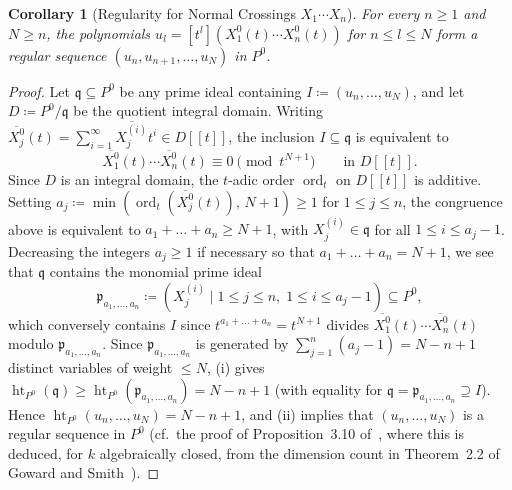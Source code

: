 \documentclass[a4paper, 12pt, reqno]{amsart}
\newtheorem{corollary}[theorem]{Corollary}
\theoremstyle{remark}
\begin{document}
\begin{corollary}[Regularity for Normal Crossings $X_1 \cdots X_n$]
  \label{cor:app-normal-crossings-reg}
  For every $n \ge 1$ and $N \ge n$,
  the polynomials $u_l = [t^l](X^0_1(t) \cdots X^0_n(t))$ for $n \le l \le N$ form a regular sequence $(u_n, u_{n + 1}, \dots, u_N)$ in $P^0$.
\end{corollary}

\begin{proof}
  Let $\mathfrak{q} \subseteq P^0$ be any prime ideal containing $I \coloneq (u_n, \dots, u_N)$,
  and let $D \coloneq P^0 / \mathfrak{q}$ be the quotient integral domain.
  Writing $\overline{X^0_j}(t) = \sum_{i = 1}^\infty \overline{X_j^{(i)}} t^i \in D[[t]]$,
  the inclusion $I \subseteq \mathfrak{q}$ is equivalent to
  \begin{equation*}
    \overline{X^0_1}(t) \cdots \overline{X^0_n}(t) \equiv 0 \pmod{t^{N + 1}} \qquad \text{in } D[[t]].
  \end{equation*}
  Since $D$ is an integral domain,
  the $t$-adic order $\operatorname{ord}_t$ on $D[[t]]$ is additive.
  Setting $a_j \coloneq \min(\operatorname{ord}_t(\overline{X^0_j}(t)), \, N + 1) \ge 1$ for $1 \le j \le n$,
  the congruence above is equivalent to $a_1 + \dots + a_n \ge N + 1$,
  with $X_j^{(i)} \in \mathfrak{q}$ for all $1 \le i \le a_j - 1$.
  Decreasing the integers $a_j \ge 1$ if necessary so that $a_1 + \dots + a_n = N + 1$,
  we see that $\mathfrak{q}$ contains the monomial prime ideal
  \begin{equation*}
    \mathfrak{p}_{a_1, \dots, a_n} \coloneq (X_j^{(i)} \mid 1 \le j \le n,\; 1 \le i \le a_j - 1) \subseteq P^0,
  \end{equation*}
  which conversely contains $I$ since $t^{a_1 + \dots + a_n} = t^{N + 1}$ divides $\overline{X^0_1}(t) \cdots \overline{X^0_n}(t)$ modulo $\mathfrak{p}_{a_1, \dots, a_n}$.
  Since $\mathfrak{p}_{a_1, \dots, a_n}$ is generated by $\sum_{j = 1}^n (a_j - 1) = N - n + 1$ distinct variables of weight $\le N$,
  (i) gives $\operatorname{ht}_{P^0}(\mathfrak{q}) \ge \operatorname{ht}_{P^0}(\mathfrak{p}_{a_1, \dots, a_n}) = N - n + 1$
  (with equality for $\mathfrak{q} = \mathfrak{p}_{a_1, \dots, a_n} \supseteq I$).
  Hence $\operatorname{ht}_{P^0}(u_n, \dots, u_N) = N - n + 1$,
  and (ii) implies that $(u_n, \dots, u_N)$ is a regular sequence in $P^0$
  (cf.\ the proof of Proposition~3.10 of~\cite{bruschek_arc_2013},
  where this is deduced, for $k$ algebraically closed, from the dimension count in Theorem~2.2 of Goward and Smith~\cite{goward_smith_2006}).
\end{proof}
\end{document}
